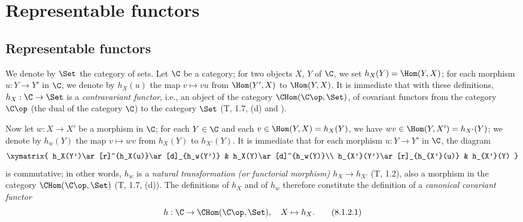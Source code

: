 \section{Representable functors}
\label{section:0.8}

\subsection{Representable functors}
\label{subsection:0.8.1}

\begin{env}[8.1.1]
\label{0.8.1.1}
We denote by $\Set$ the category of sets.
Let $\C$ be a category; for two objects $X$, $Y$ of $\C$, we set $h_X(Y)=\Hom(Y,X)$; for each morphism $u:Y\to Y'$ in $\C$, we denote by $h_X(u)$ the map $v\mapsto vu$ from $\Hom(Y',X)$ to $\Hom(Y,X)$.
It is immediate that with these definitions, $h_X:\C\to\Set$ is a \emph{contravariant functor}, i.e., an object of the category $\CHom(\C\op,\Set)$, of covariant functors from the category $\C\op$ (the dual of the category $\C$) to the category $\Set$ (T, 1.7, (d) and \cite{III-29}).
\end{env}

\begin{env}[8.1.2]
\label{0.8.1.2}
Now let $w:X\to X'$ be a morphism in $\C$; for each $Y\in\C$ and each $v\in\Hom(Y,X)=h_X(Y)$,
we have $wv\in\Hom(Y,X')=h_{X'}(Y)$; we denote by $h_w(Y)$ the map $v\mapsto wv$ from
$h_X(Y)$ to $h_{X'}(Y)$. It is immediate that for each morphism $u:Y\to Y'$ in $\C$, the
diagram
\[
  \xymatrix{
    h_X(Y')\ar[r]^{h_X(u)}\ar[d]_{h_w(Y')} &
    h_X(Y)\ar[d]^{h_w(Y)}\\
    h_{X'}(Y')\ar[r]_{h_{X'}(u)} &
    h_{X'}(Y)
  }
\]
is commutative; in other words, $h_w$ is a \emph{natural transformation (or functorial morphism)
$h_X\to h_{X'}$} (T, 1.2), also a morphism in the category $\CHom(\C\op,\Set)$ (T, 1.7, (d)). The
definitions of $h_X$ and of $h_w$ therefore constitute the definition of a \emph{canonical
covariant functor}
\[
  h:\C\to\CHom(\C\op,\Set),\quad X\mapsto h_X.
  \tag{8.1.2.1}
\]
\end{env}

